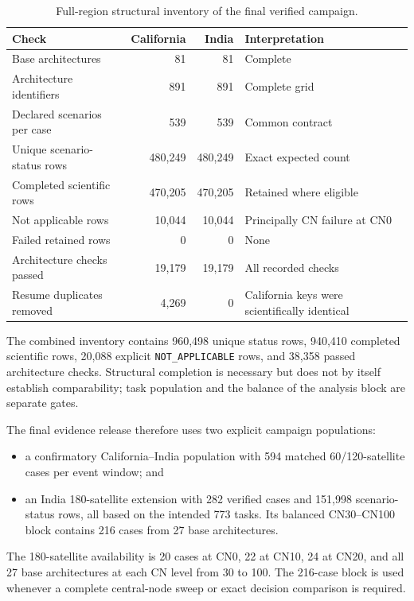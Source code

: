 \begin{table}[htbp]
\centering
\small
\caption{Full-region structural inventory of the final verified campaign.}
\label{tab:v2_validation_ledger}
\begin{tabularx}{\textwidth}{YrrY}
\toprule
Check & California & India & Interpretation \\
\midrule
Base architectures & 81 & 81 & Complete \\
Architecture identifiers & 891 & 891 & Complete grid \\
Declared scenarios per case & 539 & 539 & Common contract \\
Unique scenario-status rows & 480,249 & 480,249 & Exact expected count \\
Completed scientific rows & 470,205 & 470,205 & Retained where eligible \\
Not applicable rows & 10,044 & 10,044 & Principally CN failure at CN0 \\
Failed retained rows & 0 & 0 & None \\
Architecture checks passed & 19,179 & 19,179 & All recorded checks \\
Resume duplicates removed & 4,269 & 0 & California keys were scientifically identical \\
\bottomrule
\end{tabularx}
\end{table}

The combined inventory contains 960,498 unique status rows, 940,410 completed scientific rows, 20,088 explicit \texttt{NOT\_APPLICABLE} rows, and 38,358 passed architecture checks. Structural completion is necessary but does not by itself establish comparability; task population and the balance of the analysis block are separate gates.

The final evidence release therefore uses two explicit campaign populations:

\begin{itemize}
\item a confirmatory California--India population with 594 matched 60/120-satellite cases per event window; and
\item an India 180-satellite extension with 282 verified cases and 151,998 scenario-status rows, all based on the intended 773 tasks. Its balanced CN30--CN100 block contains 216 cases from 27 base architectures.
\end{itemize}

The 180-satellite availability is 20 cases at CN0, 22 at CN10, 24 at CN20, and all 27 base architectures at each CN level from 30 to 100. The 216-case block is used whenever a complete central-node sweep or exact decision comparison is required.

